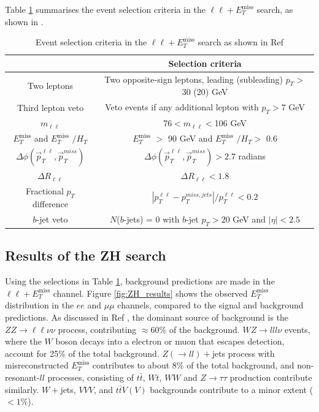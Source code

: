 \documentclass[11pt,a4paper,openright,twoside]{report}
\newcommand{\ZZ}{$ZZ\to \ell\ell\nu\nu$ }
\newcommand{\llM}{$\ell\ell+E_T^{\mathrm{miss}}$ }
\newcommand{\met}{$E_T^{\mathrm{miss}}$ }
\begin{document}
Table \ref{table:event_selection} summarises the event selection criteria in the $\ell\ell+$\met search, as shown in \cite{ZH_ATLAS}.
{\renewcommand{\arraystretch}{1.5}
\begin{table}[H]
\centering
\begin{tabular}{c c}
\hline
\hline
& Selection criteria\\
\hline
Two leptons & Two opposite-sign leptons, leading (subleading) $p_T>$ 30 (20) GeV \\
\hline
Third lepton veto & Veto events if any additional lepton with $p_T>7$ GeV\\
\hline
$m_{\ell\ell}$ & 76$<m_{\ell\ell}<$106 GeV\\
\hline
\met and \met$/H_T$ & \met$>$ 90 GeV and \met$/H_T >$ 0.6\\
\hline
$\Delta\phi(\vec{p}_T^{\ell\ell},\vec{p}_T^{miss})$ & $\Delta\phi(\vec{p}_T^{\ell\ell},\vec{p}_T^{miss})>2.7$ radians\\
\hline
$\Delta R_{\ell\ell}$ & $\Delta R_{\ell\ell}<1.8$\\
\hline
Fractional $p_T$ difference & $\left| p_T^{\ell\ell} - p_T^{miss,jets}\right|/p_T^{\ell\ell}<0.2$\\
\hline
$b$-jet veto & $N$($b$-jets) = 0 with $b$-jet $p_T>20$ GeV and $|\eta|<2.5$\\
\hline
\hline
\end{tabular}
\caption{Event selection criteria in the $\ell\ell+$\met search as shown in Ref \cite{ZH_ATLAS}}
\label{table:event_selection}
\end{table}
}
\subsection{Results of the ZH search}
Using the selections in Table \ref{table:event_selection}, background predictions are made in the \llM channel. Figure \ref{fig:ZH_results} shows the observed \met distribution in the $ee$ and $\mu\mu$ channels, compared to the signal and background predictions. As discussed in Ref \cite{ZH_ATLAS}, the dominant source of background is the \ZZ process, contributing $\approx 60\%$ of the background. $WZ\to lll\nu$ events, where the $W$ boson decays into a electron or muon that escapes detection, account for 25\% of the total background. $Z(\to ll)+$jets process with misreconstructed \met contributes to about 8\% of the total background, and non-resonant-$ll$ processes, consisting of $t\bar{t}$, $Wt$, $WW$ and $Z\to\tau\tau$ production contribute similarly. $W+$jets, $VVV$, and $t\bar{t}V(V)$ backgrounds contribute to a minor extent ($<1\%$).
\end{document}
